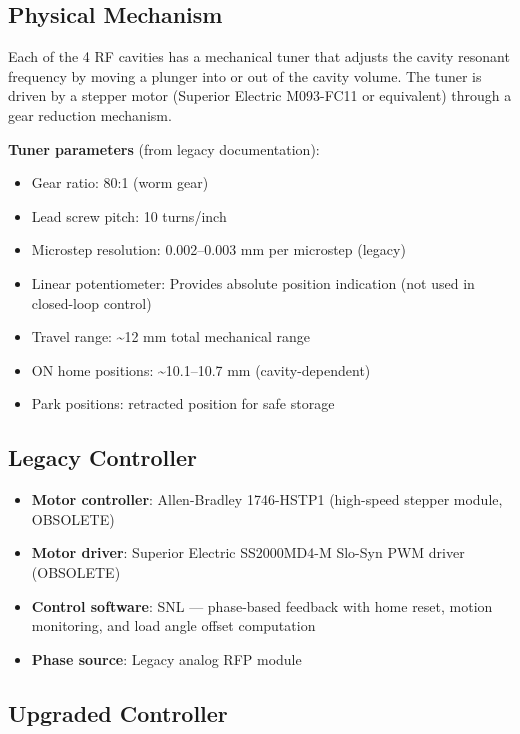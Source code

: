 \subsection{Physical Mechanism}\label{physical-mechanism}

Each of the 4 RF cavities has a mechanical tuner that adjusts the cavity resonant frequency by moving a plunger into or out of the cavity volume. The tuner is driven by a stepper motor (Superior Electric M093-FC11 or equivalent) through a gear reduction mechanism.

\textbf{Tuner parameters} (from legacy documentation):

\begin{itemize}
\tightlist
\item
  Gear ratio: 80:1 (worm gear)
\item
  Lead screw pitch: 10 turns/inch
\item
  Microstep resolution: 0.002--0.003 mm per microstep (legacy)
\item
  Linear potentiometer: Provides absolute position indication (not used in closed-loop control)
\item
  Travel range: \textasciitilde12 mm total mechanical range
\item
  ON home positions: \textasciitilde10.1--10.7 mm (cavity-dependent)
\item
  Park positions: retracted position for safe storage
\end{itemize}

\subsection{Legacy Controller}\label{legacy-controller-1}

\begin{itemize}
\tightlist
\item
  \textbf{Motor controller}: Allen-Bradley 1746-HSTP1 (high-speed stepper module, OBSOLETE)
\item
  \textbf{Motor driver}: Superior Electric SS2000MD4-M Slo-Syn PWM driver (OBSOLETE)
\item
  \textbf{Control software}: SNL  --- phase-based feedback with home reset, motion monitoring, and load angle offset computation
\item
  \textbf{Phase source}: Legacy analog RFP module
\end{itemize}

\subsection{Upgraded Controller}\label{upgraded-controller-1}

